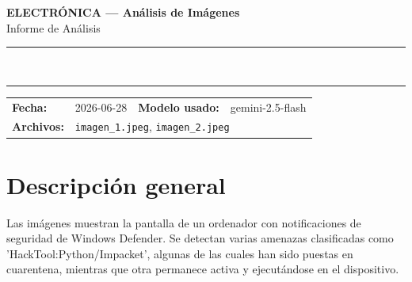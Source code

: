 \documentclass[11pt,a4paper]{article}
\begin{document}
\begin{center}
  {\Large\bfseries\color{azulTitulo} ELECTRÓNICA --- Análisis de Imágenes}\\[4pt]
  {\large Informe de Análisis}\\[12pt]
  \rule{\linewidth}{1.2pt}\\[6pt]
  \rule{\linewidth}{0.6pt}
\end{center}

\vspace{4pt}
\begin{tcolorbox}[cajaTitulo, title=Datos del análisis]
\begin{tabular}{@{}llll@{}}
  \textbf{Fecha:}       & 2026-06-28  &
  \textbf{Modelo usado:} & gemini-2.5-flash \\[4pt]
  \textbf{Archivos:}    & \multicolumn{3}{l}{\texttt{imagen\_1.jpeg}, \texttt{imagen\_2.jpeg}} \\
\end{tabular}
\end{tcolorbox}

\section*{Descripción general}
Las imágenes muestran la pantalla de un ordenador con notificaciones de seguridad de Windows Defender. Se detectan varias amenazas clasificadas como 'HackTool:Python/Impacket', algunas de las cuales han sido puestas en cuarentena, mientras que otra permanece activa y ejecutándose en el dispositivo.

\end{document}
